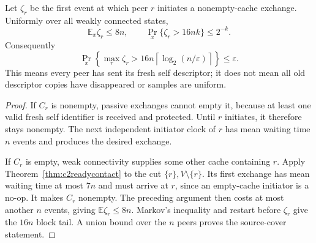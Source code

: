 
\begin{corollary}
\label{cor:c2successfulsourcecover}
Let $\zeta_r$ be the first event at which peer $r$
initiates a nonempty-cache exchange. Uniformly over
all weakly connected states,
\[
 \mathbb E_x\zeta_r\le8n,\qquad
 \Pr_x\{\zeta_r>16nk\}\le2^{-k}.
\]
Consequently
\[
 \Pr_x\!\left\{\max_r\zeta_r>
 16n\left\lceil\log_2(n/\varepsilon)\right\rceil
 \right\}\le\varepsilon.
\]
This means every peer has sent its fresh self
descriptor; it does not mean all old descriptor
copies have disappeared or samples are uniform.
\end{corollary}
\begin{proof}
If $C_r$ is nonempty, passive exchanges cannot
empty it, because at least one valid fresh self
identifier is received and protected. Until $r$
initiates, it therefore stays nonempty.
The next independent initiator clock of $r$
has mean waiting time $n$ events and produces
the desired exchange.

If $C_r$ is empty, weak connectivity supplies
some other cache containing $r$.
Apply Theorem~\ref{thm:c2readycontact} to the cut
$\{r\},V\setminus\{r\}$. Its first exchange has
mean waiting time at most $7n$ and must arrive
at $r$, since an empty-cache initiator is a
no-op. It makes $C_r$ nonempty.
The preceding argument then costs at most
another $n$ events, giving $\mathbb E\zeta_r\le8n$.
Markov's inequality and restart before $\zeta_r$
give the $16n$ block tail. A union bound over
the $n$ peers proves the source-cover statement.
\end{proof}

